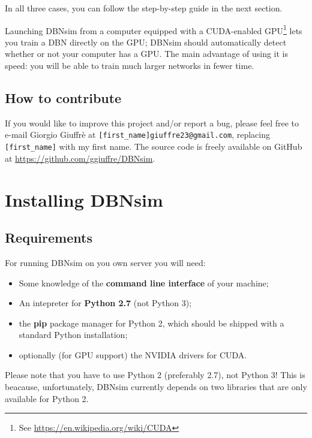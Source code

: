 \documentclass[a4paper]{article}
\begin{document}
In all three cases, you can follow the step-by-step guide in the next section.

Launching DBNsim from a computer equipped with a CUDA-enabled GPU\footnote{See \url{https://en.wikipedia.org/wiki/CUDA}} lets you train a DBN directly on the GPU; DBNsim should automatically detect whether or not your computer has a GPU. The main advantage of using it is speed: you will be able to train much larger networks in fewer time.


\subsection{How to contribute}

If you would like to improve this project and/or report a bug, please feel free to e-mail Giorgio Giuffrè at \texttt{[first\_name]giuffre23@gmail.com}, replacing \texttt{[first\_name]} with my first name. The source code is freely available on GitHub at \url{https://github.com/ggiuffre/DBNsim}.



		
	\section{Installing DBNsim}


		
	\subsection{Requirements}

		
For running DBNsim on you own server you will need:
		
	\begin{itemize}
		
			
	\item Some knowledge of the \textbf{command line interface} of your machine;
			
	\item An intepreter for \textbf{Python 2.7} (not Python 3);
			
	\item the \textbf{pip} package manager for Python 2, which should be shipped with a standard Python installation;
			
	\item optionally (for GPU support) the NVIDIA drivers for CUDA.
		
	\end{itemize}

		
Please note that you have to use Python 2 (preferably 2.7), not Python 3! This is beacause, unfortunately, DBNsim currently depends on two libraries that are only available for Python 2.
		
\end{document}
